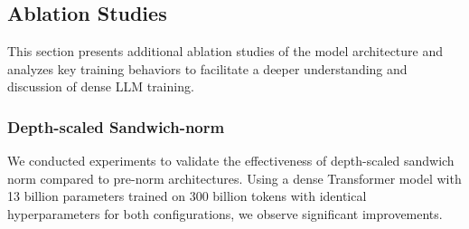 \begin{table}[!h]
    \centering
    \caption{Comparison of \modelname~models and other representative models across benchmarks. $\dagger$ indicates results from Artificial Analysis \cite{ai_analysis}.}
    \label{tab:StandardBenchmarks}
\end{table}

\subsection{Ablation Studies}  
This section presents additional ablation studies of the model architecture and analyzes key training behaviors to facilitate a deeper understanding and discussion of dense LLM training.

\subsubsection{Depth-scaled Sandwich-norm} \label{sec:sandwich-ablation}
We conducted experiments to validate the effectiveness of depth-scaled sandwich norm compared to pre-norm architectures. Using a dense Transformer model with 13 billion parameters trained on 300 billion tokens with identical hyperparameters for both configurations, we observe significant improvements.

